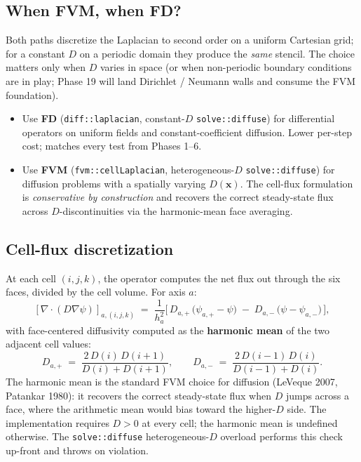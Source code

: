 \subsection{When FVM, when FD?}\label{phase14-when}

Both paths discretize the Laplacian to second order on a uniform
Cartesian grid; for a constant \(D\) on a periodic domain they produce
the \emph{same} stencil. The choice matters only when
\(D\) varies in space (or when non-periodic boundary conditions are
in play; Phase 19 will land Dirichlet / Neumann walls and consume the
FVM foundation).

\begin{itemize}
\tightlist
\item
  Use \textbf{FD}
  (\passthrough{\lstinline!diff::laplacian!},
  constant-\(D\)
  \passthrough{\lstinline!solve::diffuse!}) for differential operators
  on uniform fields and constant-coefficient diffusion. Lower
  per-step cost; matches every test from Phases 1--6.
\item
  Use \textbf{FVM}
  (\passthrough{\lstinline!fvm::cellLaplacian!},
  heterogeneous-\(D\)
  \passthrough{\lstinline!solve::diffuse!}) for diffusion problems
  with a spatially varying \(D(\mathbf x)\). The cell-flux formulation
  is \emph{conservative by construction} and recovers the correct
  steady-state flux across \(D\)-discontinuities via the harmonic-mean
  face averaging.
\end{itemize}

\subsection{Cell-flux discretization}\label{phase14-cellflux}

At each cell \((i, j, k)\), the operator computes the net flux out
through the six faces, divided by the cell volume. For axis \(a\):
\[
[\nabla\!\cdot\!(D\nabla\psi)]_{a,(i,j,k)}
\;=\;
\frac{1}{h_a^2}\Big[\,D_{a,+}\,\big(\psi_{a,+}-\psi\big)
\;-\; D_{a,-}\,\big(\psi-\psi_{a,-}\big)\,\Big],
\]
with face-centered diffusivity computed as the \textbf{harmonic mean}
of the two adjacent cell values:
\[
D_{a,+} \;=\; \frac{2\,D(i)\,D(i+1)}{D(i) + D(i+1)},
\qquad
D_{a,-} \;=\; \frac{2\,D(i-1)\,D(i)}{D(i-1) + D(i)}.
\]
The harmonic mean is the standard FVM choice for diffusion (LeVeque
2007, Patankar 1980): it recovers the correct steady-state flux when
\(D\) jumps across a face, where the arithmetic mean would bias
toward the higher-\(D\) side. The implementation requires
\(D > 0\) at every cell; the harmonic mean is undefined otherwise.
The \passthrough{\lstinline!solve::diffuse!} heterogeneous-\(D\) overload
performs this check up-front and throws on violation.

